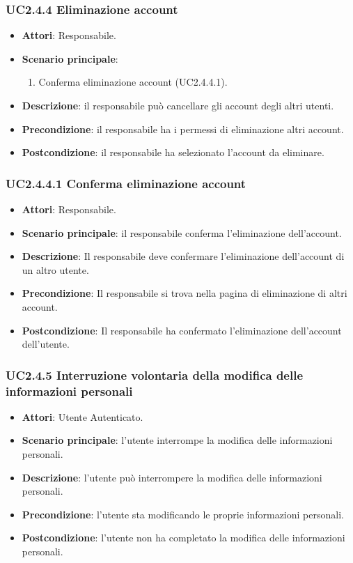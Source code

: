\subsubsection{UC2.4.4 Eliminazione account}
\begin{itemize}
\item \textbf{Attori}: Responsabile.
\item \textbf{Scenario principale}:
\begin{enumerate}
\item Conferma eliminazione account (UC2.4.4.1).
\end{enumerate}
\item \textbf{Descrizione}: il responsabile può cancellare gli account degli altri utenti.
\item \textbf{Precondizione}: il responsabile ha i permessi di eliminazione altri account.
\item \textbf{Postcondizione}: il responsabile ha selezionato l'account da eliminare.
\end{itemize}
\subsubsection{UC2.4.4.1 Conferma eliminazione account}
\begin{itemize}
\item \textbf{Attori}: Responsabile.
\item \textbf{Scenario principale}: il responsabile conferma l'eliminazione dell'account.
\item \textbf{Descrizione}: Il responsabile deve confermare l'eliminazione dell'account di un altro utente.
\item \textbf{Precondizione}: Il responsabile si trova nella pagina di eliminazione di altri account.
\item \textbf{Postcondizione}: Il responsabile ha confermato l'eliminazione dell'account dell'utente.
\end{itemize}
\subsubsection{UC2.4.5 Interruzione volontaria della modifica delle informazioni personali}
\begin{itemize}
\item \textbf{Attori}: Utente Autenticato.
\item \textbf{Scenario principale}: l'utente interrompe la modifica delle informazioni personali.
\item \textbf{Descrizione}: l'utente può interrompere la modifica delle informazioni personali.
\item \textbf{Precondizione}: l'utente sta modificando le proprie informazioni personali.
\item \textbf{Postcondizione}: l'utente non ha completato la modifica delle informazioni personali.
\end{itemize}
